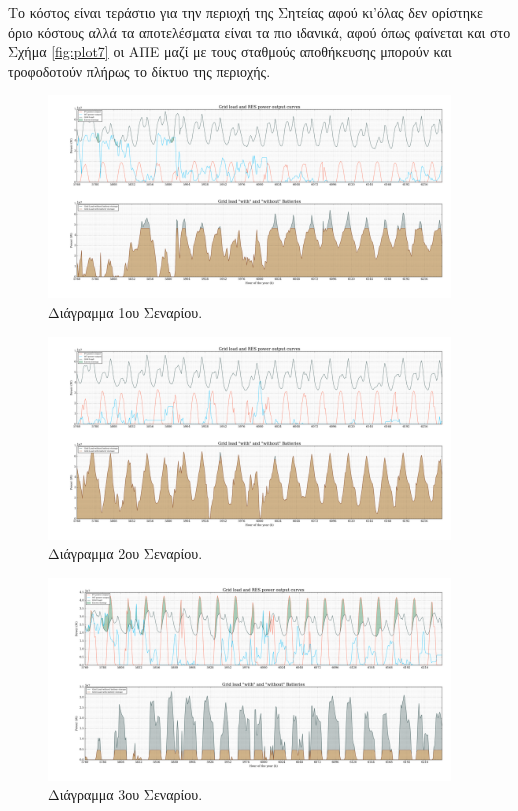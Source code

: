 \documentclass[12pt]{report}
\begin{document}
Το κόστος είναι τεράστιο για την περιοχή της Σητείας αφού κι'όλας δεν ορίστηκε όριο κόστους αλλά τα αποτελέσματα είναι τα πιο ιδανικά, αφού όπως φαίνεται και στο Σχήμα \ref{fig:plot7} οι ΑΠΕ μαζί με τους σταθμούς αποθήκευσης
μπορούν και τροφοδοτούν πλήρως το δίκτυο της περιοχής.
\begin{figure}
				\center
				\includegraphics[width=0.95\textwidth]{scenarios/1/plot}
				\caption{Διάγραμμα 1ου Σεναρίου.}
				\label{fig:plot1}
\end{figure}

\begin{figure}
				\center
				\includegraphics[width=0.95\textwidth]{scenarios/2/plot}
				\caption{Διάγραμμα 2ου Σεναρίου.}
				\label{fig:plot2}
\end{figure}

\begin{figure}
				\center
				\includegraphics[width=0.95\textwidth]{scenarios/3/plot}
				\caption{Διάγραμμα 3ου Σεναρίου.}
				\label{fig:plot3}
\end{figure}
\end{document}
